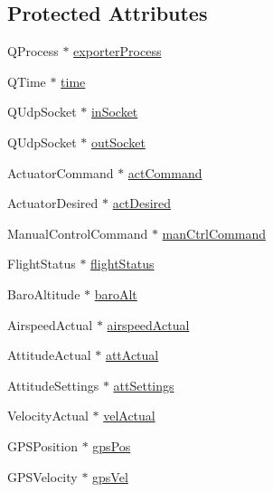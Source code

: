 \subsection*{Protected Attributes}
\begin{DoxyCompactItemize}
\item 
Q\-Process $\ast$ \hyperlink{group___mo_cap_plugin_ga3e0f59d7efdaba4ae56afc474e929a17}{exporter\-Process}
\item 
Q\-Time $\ast$ \hyperlink{group___mo_cap_plugin_gac71372aac301b0f6d2ae67c3a5c4be63}{time}
\item 
Q\-Udp\-Socket $\ast$ \hyperlink{group___mo_cap_plugin_ga01c0037d3abe6f3cfc9521e865cbe65f}{in\-Socket}
\item 
Q\-Udp\-Socket $\ast$ \hyperlink{group___mo_cap_plugin_gad4adc615f73413f479e48983cce6f3e0}{out\-Socket}
\item 
Actuator\-Command $\ast$ \hyperlink{group___mo_cap_plugin_gaaa8cd64f3935d77113b41cf84f398e78}{act\-Command}
\item 
Actuator\-Desired $\ast$ \hyperlink{group___mo_cap_plugin_ga480be6f8874e252461095878c7b41d08}{act\-Desired}
\item 
Manual\-Control\-Command $\ast$ \hyperlink{group___mo_cap_plugin_ga8855725831e82f6e02e0caba72c0dd7b}{man\-Ctrl\-Command}
\item 
Flight\-Status $\ast$ \hyperlink{group___mo_cap_plugin_ga63bef489a0fb9ccf02eadc577d487c10}{flight\-Status}
\item 
Baro\-Altitude $\ast$ \hyperlink{group___mo_cap_plugin_ga15711fcb53727148f4c62b5bfa1ce9f1}{baro\-Alt}
\item 
Airspeed\-Actual $\ast$ \hyperlink{group___mo_cap_plugin_ga933ba2309643df8ddd342ae4cf010fca}{airspeed\-Actual}
\item 
Attitude\-Actual $\ast$ \hyperlink{group___mo_cap_plugin_gaa96960187d095cbbc69ba0cc08d776a7}{att\-Actual}
\item 
Attitude\-Settings $\ast$ \hyperlink{group___mo_cap_plugin_gaa7be67cf3fe5bd561bfd56b81ace46d6}{att\-Settings}
\item 
Velocity\-Actual $\ast$ \hyperlink{group___mo_cap_plugin_gaf7dc7b4cb9c561edf9c8df28131eeac3}{vel\-Actual}
\item 
G\-P\-S\-Position $\ast$ \hyperlink{group___mo_cap_plugin_gab8839ee3d842d22d5717905f7dea20cd}{gps\-Pos}
\item 
G\-P\-S\-Velocity $\ast$ \hyperlink{group___mo_cap_plugin_ga75de3c84f1e0fec7aec493cb1a27b9a8}{gps\-Vel}
\item 

\end{DoxyCompactItemize}
